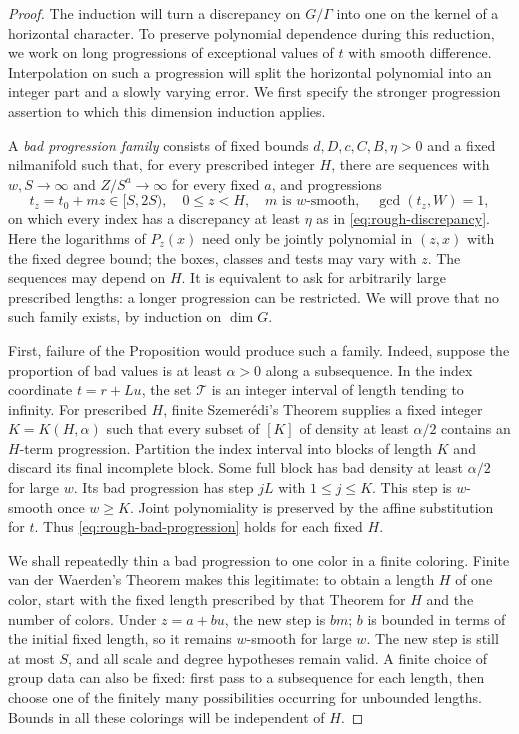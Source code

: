 \begin{proof}
The induction will turn a discrepancy on $G/\Gamma$ into one on the
kernel of a horizontal character.  To preserve polynomial dependence
during this reduction, we work on long progressions of exceptional
values of $t$ with smooth difference.  Interpolation on such a
progression will split the horizontal polynomial into an integer part
and a slowly varying error.  We first specify the stronger progression
assertion to which this dimension induction applies.

A \emph{bad progression family} consists of fixed
bounds $d,D,c,C,B,\eta>0$ and a fixed nilmanifold such that, for every
prescribed integer $H$, there are sequences with $w,S\to\infty$ and
$Z/S^a\to\infty$ for every fixed $a$, and progressions
\begin{equation}
 t_z=t_0+mz\in[S,2S),\quad 0\leq z<H,\quad
 m\text{ is }w\text{-smooth},\quad \gcd(t_z,W)=1,
 \label{eq:rough-bad-progression}
\end{equation}
on which every index has a discrepancy at least $\eta$ as in
\eqref{eq:rough-discrepancy}.  Here the logarithms of $P_z(x)$ need
only be jointly polynomial in $(z,x)$ with the fixed degree bound;
the boxes, classes and tests may vary with $z$.  The sequences may
depend on $H$.  It is equivalent to ask for arbitrarily large prescribed
lengths: a longer progression can be restricted.  We will prove that
no such family exists, by induction on $\dim G$.

First, failure of the Proposition would produce such a family.  Indeed,
suppose the proportion of bad values is at least $\alpha>0$ along a
subsequence.  In the index coordinate $t=r+Lu$, the set $\mathcal T$
is an integer interval of length tending to infinity.  For prescribed
$H$, finite Szemer\'edi's Theorem \cite{Szemeredi} supplies a fixed
integer $K=K(H,\alpha)$ such that every subset of $[K]$ of density
at least $\alpha/2$ contains an $H$-term progression.  Partition the
index interval into blocks of length $K$ and discard its final
incomplete block.  Some full block has bad density at least
$\alpha/2$ for large $w$.  Its bad progression has step $jL$ with
$1\leq j\leq K$.  This step is $w$-smooth once $w\geq K$.
Joint polynomiality is preserved by the affine substitution for $t$.
Thus \eqref{eq:rough-bad-progression} holds for each fixed $H$.

We shall repeatedly thin a bad progression to one color in a finite
coloring.  Finite van der Waerden's Theorem \cite{vanderWaerden} makes
this legitimate: to obtain a length $H$ of one color, start with the
fixed length prescribed by that Theorem for $H$ and the number of
colors.  Under $z=a+bu$, the new step is $bm$; $b$ is bounded in terms
of the initial fixed length, so it remains $w$-smooth for large $w$.
The new step is still at most $S$, and all scale and degree hypotheses
remain valid.  A finite choice of group data can also be fixed: first
pass to a subsequence for each length, then choose one of the finitely
many possibilities occurring for unbounded lengths.  Bounds in all
these colorings will be independent of $H$.


\end{proof}
